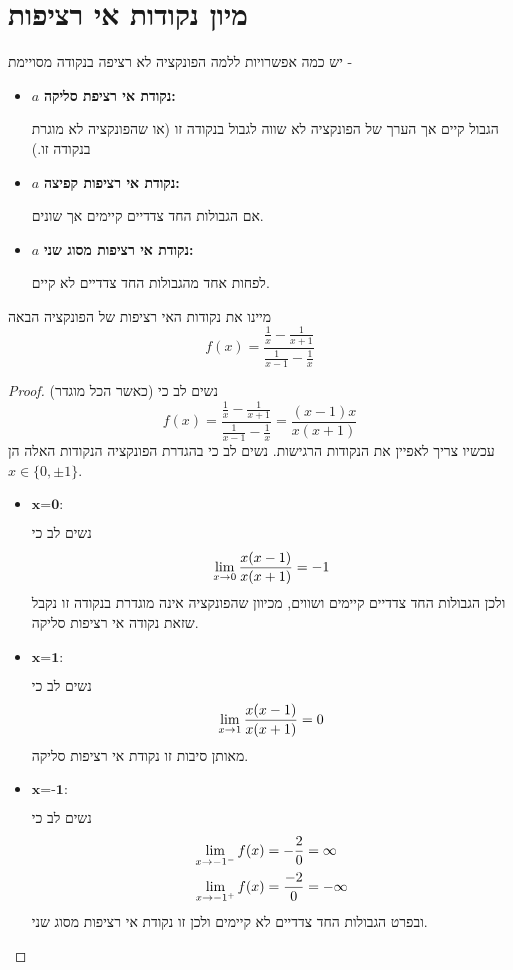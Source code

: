 \documentclass{article}
\begin{document}
\section{מיון נקודות אי רציפות}
יש כמה אפשרויות ללמה הפונקציה לא רציפה בנקודה מסויימת - 
\begin{itemize}
\item 
$a$
\textbf{נקודת אי רציפת סליקה: }
\par\noindent
הגבול קיים אך הערך של הפונקציה לא שווה לגבול בנקודה זו (או שהפונקציה לא מוגרת בנקודה זו.)
\item 
$a$
\textbf{נקודת אי רציפות קפיצה: }
\par\noindent
אם הגבולות החד צדדיים קיימים אך שונים. 
\item 
$a$
\textbf{נקודת אי רציפות מסוג שני: }
\par \noindent
לפחות אחד מהגבולות החד צדדיים לא קיים.
\end{itemize}

\begin{exercise}
מיינו את נקודות האי רציפות של הפונקציה הבאה 
\[f(x) = \frac{\frac{1}{x} - \frac{1}{x+1}}{\frac{1}{x-1}-\frac{1}{x}}\]
\end{exercise}

\begin{proof}
נשים לב כי (כאשר הכל מוגדר)
\[f(x) = \frac{\frac{1}{x} - \frac{1}{x+1}}{\frac{1}{x-1}-\frac{1}{x}} = \frac{(x-1)x}{x(x+1)}\]
עכשיו צריך לאפיין את הנקודות הרגישות. נשים לב כי בהגדרת הפונקציה הנקודות האלה הן 
$x\in\{0, \pm 1\}$. 
\begin{itemize}
\item $\textbf{x=0:}$ \par\noindent
נשים לב כי 
\[\underset{x\rightarrow0}{\lim}\,\frac{x(x-1)}{x(x+1)} = -1\]
ולכן הגבולות החד צדדיים קיימים ושווים, מכיוון שהפונקציה אינה מוגדרת בנקודה זו נקבל שזאת נקודה אי רציפות סליקה.
\item $\textbf{x=1:}$ \par\noindent
נשים לב כי 
\[\underset{x\rightarrow1}{\lim}\,\frac{x(x-1)}{x(x+1)} = 0\]
מאותן סיבות זו נקודת אי רציפות סליקה. 
\item $\textbf{x=-1:}$ \par\noindent
נשים לב כי 
\begin{align*}
\underset{x\rightarrow-1^-}{\lim}\, f(x) &= -\frac{2}{0} = \infty \\
\underset{x\rightarrow-1^+}{\lim}\, f(x) &= \frac{-2}{0} = -\infty
\end{align*}
ובפרט הגבולות החד צדדיים לא קיימים ולכן זו נקודת אי רציפות מסוג שני. 
\end{itemize}
\end{proof}
\end{document}
